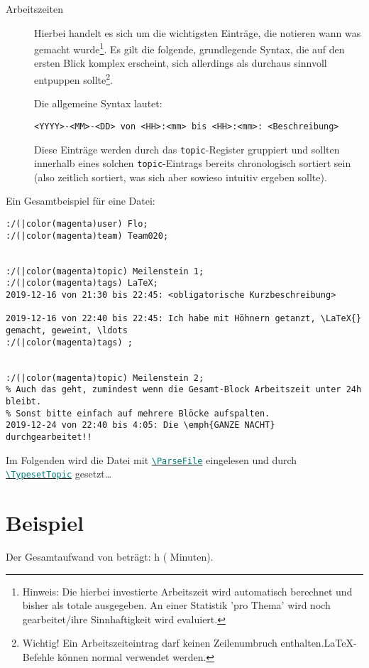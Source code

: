 \documentclass{article}
\def\cmd#1{\texttt{\textcolor{teal}{\textbackslash#1}}}
\def\cmdref#1{\hyperref[cmd:#1]{\cmd{#1}}}
\begin{document}
\begin{description}
    \item[Arbeitszeiten] Hierbei handelt es sich um die wichtigsten Einträge, die notieren wann was gemacht wurde\footnote{Hinweis: Die hierbei investierte Arbeitszeit wird automatisch berechnet und bisher als totale ausgegeben. An einer Statistik 'pro Thema' wird noch gearbeitet/ihre Sinnhaftigkeit wird evaluiert.}. Es gilt die folgende, grundlegende Syntax, die auf den ersten Blick komplex erscheint, sich allerdings als durchaus sinnvoll entpuppen sollte\footnote{Wichtig! Ein Arbeitszeiteintrag darf keinen Zeilenumbruch enthalten.\LaTeX-Befehle können normal verwendet werden.}.\par{} Die allgemeine Syntax lautet:
\begin{Verbatim}
<YYYY>-<MM>-<DD> von <HH>:<mm> bis <HH>:<mm>: <Beschreibung>
\end{Verbatim}
          Diese Einträge werden durch das \texttt{topic}-Register gruppiert und sollten innerhalb eines solchen \texttt{topic}-Eintrags bereits chronologisch sortiert sein (also zeitlich sortiert, was sich aber sowieso intuitiv ergeben sollte).
\end{description}

Ein Gesamtbeispiel für eine Datei:
\begin{Verbatim}[label=\fbox{\color{black}example.def}]
:/(|color(magenta)user) Flo;
:/(|color(magenta)team) Team020;


:/(|color(magenta)topic) Meilenstein 1;
:/(|color(magenta)tags) LaTeX;
2019-12-16 von 21:30 bis 22:45: <obligatorische Kurzbeschreibung>

2019-12-16 von 22:40 bis 22:45: Ich habe mit Höhnern getanzt, \LaTeX{} gemacht, geweint, \ldots
:/(|color(magenta)tags) ;


:/(|color(magenta)topic) Meilenstein 2;
% Auch das geht, zumindest wenn die Gesamt-Block Arbeitszeit unter 24h bleibt.
% Sonst bitte einfach auf mehrere Blöcke aufspalten.
2019-12-24 von 22:40 bis 4:05: Die \emph{GANZE NACHT} durchgearbeitet!!
\end{Verbatim}

Im Folgenden wird die Datei mit \cmdref{ParseFile} eingelesen und durch \cmdref{TypesetTopic} gesetzt\ldots

\section{Beispiel}
Der Gesamtaufwand von  beträgt:
h ( Minuten).
\end{document}
